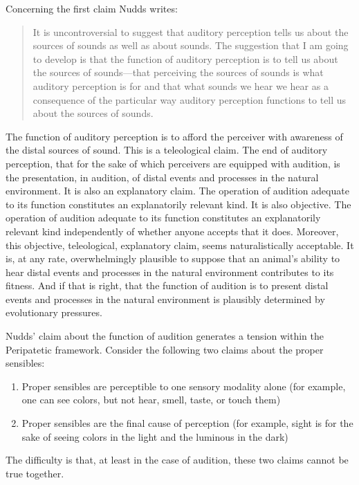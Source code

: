 Concerning the first claim Nudds writes:
\begin{quote}
	It is uncontroversial to suggest that auditory perception tells us about the sources of sounds as well as about sounds. The suggestion that I am going to develop is that the function of auditory perception is to tell us about the sources of sounds---that perceiving the sources of sounds is what auditory perception is for and that what sounds we hear we hear as a consequence of the particular way auditory perception functions to tell us about the sources of sounds. \citep[284]{Nudds:2010aa}
\end{quote}
The function of auditory perception is to afford the perceiver with awareness of the distal sources of sound. This is a teleological claim. The end of auditory perception, that for the sake of which perceivers are equipped with audition, is the presentation, in audition, of distal events and processes in the natural environment. It is also an explanatory claim. The operation of audition adequate to its function constitutes an explanatorily relevant kind. It is also objective. The operation of audition adequate to its function constitutes an explanatorily relevant kind independently of whether anyone accepts that it does. Moreover, this objective, teleological, explanatory claim, seems naturalistically acceptable. It is, at any rate, overwhelmingly plausible to suppose that an animal's ability to hear distal events and processes in the natural environment contributes to its fitness. And if that is right, that the function of audition is to present distal events and processes in the natural environment is plausibly determined by evolutionary pressures.

Nudds' claim about the function of audition generates a tension within the Peripatetic framework. Consider the following two claims about the proper sensibles:
\begin{enumerate}[(1)]
	\item Proper sensibles are perceptible to one sensory modality alone (for example, one can see colors, but not hear, smell, taste, or touch them)
	\item Proper sensibles are the final cause of perception (for example, sight is for the sake of seeing colors in the light and the luminous in the dark)
\end{enumerate}
The difficulty is that, at least in the case of audition, these two claims cannot be true together.

